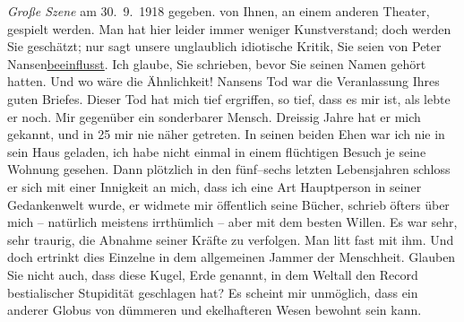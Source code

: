 \begin{ledgroupsized}[t]{13cm}
{{{                     \emph{Große Szene} am 30. 9. 1918
                  gegeben.}}}\label{K_L02303-2h} von Ihnen, an einem anderen Theater, gespielt werden. Man hat hier
               leider immer weniger Kunstverstand; doch werden Sie geschätzt; nur sagt unsere
               unglaublich idiotische Kritik, Sie seien von Peter
                  Nansen\uline{beeinflusst}. Ich glaube, Sie schrieben, bevor Sie
               seinen Namen gehört hatten. Und wo wäre die Ähnlichkeit!\pend
           \pstart
           Nansens Tod war die Veranlassung Ihres guten
               Briefes. Dieser Tod hat mich tief ergriffen, so tief, dass es mir ist, als lebte er
               noch. Mir gegenüber ein sonderbarer Mensch. Dreissig Jahre hat er mich gekannt, und
                  \introOben{}in 25\introOben{} mir nie näher getreten. In seinen beiden Ehen war
               ich nie in sein Haus geladen, ich habe nicht einmal in einem flüchtigen Besuch je
               seine Wohnung {\pb}gesehen. Dann
               plötzlich in den fünf–sechs letzten Lebensjahren schloss er sich mit einer Innigkeit
               an mich, dass ich eine Art Hauptperson in seiner Gedankenwelt wurde, er widmete mir
               öffentlich seine Bücher,
               schrieb öfters über mich – natürlich meistens irrthümlich – aber mit dem besten
               Willen.\pend
           \pstart
           Es war sehr, sehr traurig, die Abnahme seiner Kräfte zu verfolgen. Man litt fast mit
               ihm.\pend
           \pstart
           Und doch ertrinkt dies Einzelne in dem allgemeinen Jammer der Menschheit. Glauben Sie
               nicht  auch, dass diese Kugel, Erde genannt, in dem
               Weltall den Record bestialischer Stupidität geschlagen hat? Es scheint mir unmöglich,
               dass ein anderer Globus von dümmeren und ekelhafteren Wesen bewohnt sein kann.\pend

\end{ledgroupsized}
